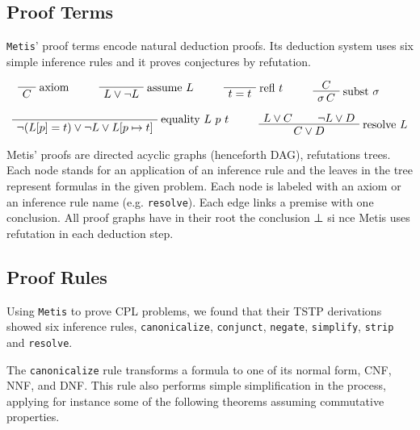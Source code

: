 \documentclass[runningheads,a4paper]{llncs}
\newenvironment{bprooftree}
  {\leavevmode\hbox\bgroup}
  {\DisplayProof\egroup}
\begin{document}
\subsection{Proof Terms}

\verb!Metis!' proof terms encode natural deduction proofs. Its deduction system uses six simple inference rules and it proves conjectures by refutation.

\[
\begin{bprooftree}
\AxiomC{}
\RightLabel{axiom}
\UnaryInfC{$C$}
\end{bprooftree}
\qquad
\begin{bprooftree}
\AxiomC{}
\RightLabel{assume $L$}
\UnaryInfC{$L \vee \neg L$}
\end{bprooftree}
\qquad
\begin{bprooftree}
\AxiomC{}
\RightLabel{refl $t$}
\UnaryInfC{$t = t$}
\end{bprooftree}
\qquad
\begin{bprooftree}
\AxiomC{$C$}
\RightLabel{subst $\sigma$}
\UnaryInfC{$\sigma\,C$}
\end{bprooftree}
\qquad
\]

\[
\begin{bprooftree}
\AxiomC{}
\RightLabel{equality $L$ $p$ $t$}
\UnaryInfC{$\neg (L[p] = t) \vee \neg L \vee L[ p \mapsto t]$}
\end{bprooftree}
\qquad
\begin{bprooftree}
\AxiomC{$L \vee C$}
\AxiomC{$\neg L \vee D$}
\RightLabel{resolve $L$}
\BinaryInfC{$C \vee D$}
\end{bprooftree}
\]

Metis’ proofs are directed acyclic graphs (henceforth DAG), refutations trees. Each node stands for an application of an inference rule and the leaves in the tree represent formulas in the given problem. Each node is labeled with an axiom or an inference rule name (e.g. \verb!resolve!). Each edge links a premise with one conclusion. All proof graphs have in their root the conclusion ⊥ si
nce Metis uses refutation in each deduction step.


\subsection{Proof Rules}
Using \verb!Metis! to prove CPL problems, we found that their TSTP derivations showed six inference rules, \verb!canonicalize!, \verb!conjunct!, \verb!negate!, \verb!simplify!,  \verb!strip! and \verb!resolve!. 

The \verb!canonicalize! rule transforms a formula to one of its normal form, CNF, NNF, and DNF.
This rule also performs simple simplification in the process, applying for instance some of the following theorems assuming commutative properties.
\end{document}
